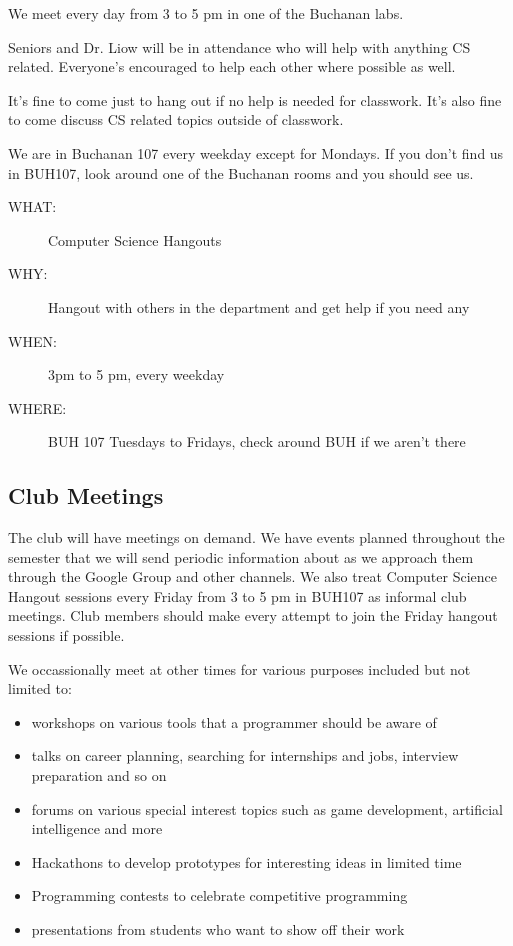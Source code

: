 We meet every day from 3 to 5 pm in one of the Buchanan labs.

Seniors and Dr. Liow will be in attendance who will help with anything CS
related. Everyone's encouraged to help each other where possible as well.

It's fine to come just to hang out if no help is needed for classwork. It's
also fine to come discuss CS related topics outside of classwork.

We are in Buchanan 107 every weekday except for Mondays. If you don't find us
in BUH107, look around one of the Buchanan rooms and you should see us.

\begin{description}
\item[{WHAT:}] Computer Science Hangouts
\item[{WHY:}] Hangout with others in the department and get help if you need any
\item[{WHEN:}] 3pm to 5 pm, every weekday
\item[{WHERE:}] BUH 107 Tuesdays to Fridays, check around BUH if we aren't there
\end{description}

\newpage

\subsection{Club Meetings}
\label{sec:orgheadline8}

The club will have meetings on demand. We have events planned throughout the
semester that we will send periodic information about as we approach them
through the Google Group and other channels. We also treat Computer Science
Hangout sessions every Friday from 3 to 5 pm in BUH107 as informal club
meetings. Club members should make every attempt to join the Friday hangout
sessions if possible.

We occassionally meet at other times for various purposes included but not
limited to:
\begin{itemize}
\item workshops on various tools that a programmer should be aware of
\item talks on career planning, searching for internships and jobs, interview
preparation and so on
\item forums on various special interest topics such as game development,
artificial intelligence and more
\item Hackathons to develop prototypes for interesting ideas in limited time
\item Programming contests to celebrate competitive programming
\item presentations from students who want to show off their work
\end{itemize}

